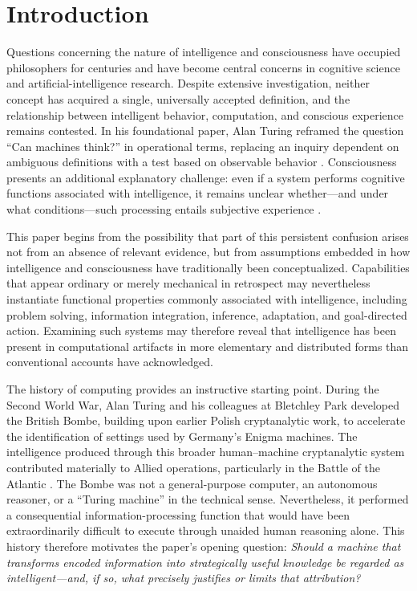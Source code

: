 % 

\section{Introduction}
\label{sec:introduction}

Questions concerning the nature of intelligence and consciousness have occupied
philosophers for centuries and have become central concerns in cognitive science
and artificial-intelligence research. Despite extensive investigation, neither
concept has acquired a single, universally accepted definition, and the
relationship between intelligent behavior, computation, and conscious experience
remains contested. In his foundational paper, Alan Turing reframed the question
``Can machines think?'' in operational terms, replacing an inquiry dependent on
ambiguous definitions with a test based on observable behavior
\cite{turing1950computing}. Consciousness presents an additional explanatory
challenge: even if a system performs cognitive functions associated with
intelligence, it remains unclear whether---and under what conditions---such
processing entails subjective experience
\cite{chalmers1995facing,block1995confusion}.

This paper begins from the possibility that part of this persistent confusion
arises not from an absence of relevant evidence, but from assumptions embedded in
how intelligence and consciousness have traditionally been conceptualized.
Capabilities that appear ordinary or merely mechanical in retrospect may
nevertheless instantiate functional properties commonly associated with
intelligence, including problem solving, information integration, inference,
adaptation, and goal-directed action. Examining such systems may therefore reveal
that intelligence has been present in computational artifacts in more elementary
and distributed forms than conventional accounts have acknowledged.

The history of computing provides an instructive starting point. During the
Second World War, Alan Turing and his colleagues at Bletchley Park developed the
British Bombe, building upon earlier Polish cryptanalytic work, to accelerate the
identification of settings used by Germany's Enigma machines. The intelligence
produced through this broader human--machine cryptanalytic system contributed
materially to Allied operations, particularly in the Battle of the Atlantic
\cite{copeland2004essential}. The Bombe was not a general-purpose computer, an
autonomous reasoner, or a ``Turing machine'' in the technical sense. Nevertheless,
it performed a consequential information-processing function that would have
been extraordinarily difficult to execute through unaided human reasoning alone.
This history therefore motivates the paper's opening question: \emph{Should a
machine that transforms encoded information into strategically useful knowledge
be regarded as intelligent---and, if so, what precisely justifies or limits that
attribution?}

